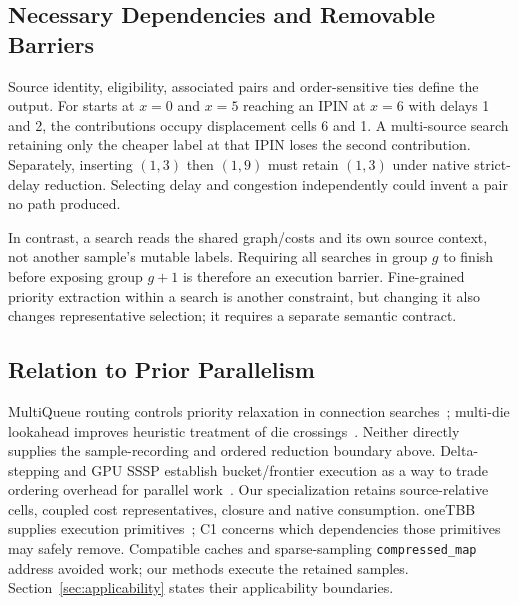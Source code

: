 \subsection{Necessary Dependencies and Removable Barriers}
Source identity, eligibility, associated pairs and order-sensitive ties define the output. For starts at $x=0$ and $x=5$ reaching an IPIN at $x=6$ with delays 1 and 2, the contributions occupy displacement cells 6 and 1. A multi-source search retaining only the cheaper label at that IPIN loses the second contribution. Separately, inserting $(1,3)$ then $(1,9)$ must retain $(1,3)$ under native strict-delay reduction. Selecting delay and congestion independently could invent a pair no path produced.

In contrast, a search reads the shared graph/costs and its own source context, not another sample's mutable labels. Requiring all searches in group $g$ to finish before exposing group $g+1$ is therefore an execution barrier. Fine-grained priority extraction within a search is another constraint, but changing it also changes representative selection; it requires a separate semantic contract.

\subsection{Relation to Prior Parallelism}
MultiQueue routing controls priority relaxation in connection searches~\cite{multiqueue}; multi-die lookahead improves heuristic treatment of die crossings~\cite{multidie}. Neither directly supplies the sample-recording and ordered reduction boundary above. Delta-stepping and GPU SSSP establish bucket/frontier execution as a way to trade ordering overhead for parallel work~\cite{delta,gpu_sssp}. Our specialization retains source-relative cells, coupled cost representatives, closure and native consumption. oneTBB supplies execution primitives~\cite{tbb}; C1 concerns which dependencies those primitives may safely remove. Compatible caches and sparse-sampling \texttt{compressed\_map}~\cite{vproptions} address avoided work; our methods execute the retained samples. Section~\ref{sec:applicability} states their applicability boundaries.
